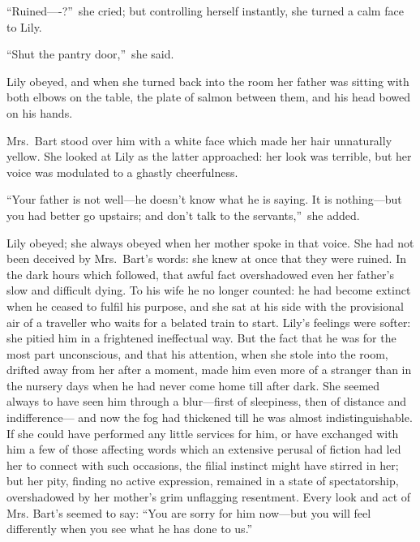 \documentclass[12pt,a4paper]{book}
\begin{document}
``Ruined----?''\ she cried; but controlling herself instantly, she
turned a calm face to Lily.





``Shut the pantry door,''\ she said.





Lily obeyed, and when she turned back into the room her father
was sitting with both elbows on the table, the plate of salmon
between them, and his head bowed on his hands.





Mrs.\ Bart stood over him with a white face which made her hair
unnaturally yellow. She looked at Lily as the latter approached: 
her look was terrible, but her voice was modulated to a ghastly
cheerfulness.





``Your father is not well---he doesn't know what he is saying. It
is nothing---but you had better go upstairs; and don't talk to the
servants,''\ she added.





Lily obeyed; she always obeyed when her mother spoke in that
voice. She had not been deceived by Mrs.\ Bart's words: she knew
at once that they were ruined. In the dark hours which followed,
that awful fact overshadowed even her father's slow and difficult
dying. To his wife he no longer counted: he had become extinct
when he ceased to fulfil his purpose, and she sat at his side
with the provisional air of a traveller who waits for a belated
train to start. Lily's feelings were softer: she pitied him in a
frightened ineffectual way. But the fact that he was for the most
part unconscious, and that his attention, when she stole into the
room, drifted away from her after a moment, made him even more of
a stranger than in the nursery days when he had never come home
till after dark. She seemed always to have seen him through a
blur---first of sleepiness, then of distance and indifference---
and now the fog had thickened till he was almost
indistinguishable. If she could have performed any little
services for him, or have exchanged with him a few of those
affecting words which an extensive perusal of fiction had
led her to connect with such occasions, the filial instinct might
have stirred in her; but her pity, finding no active expression,
remained in a state of spectatorship, overshadowed by her
mother's grim unflagging resentment. Every look and act of Mrs.
Bart's seemed to say: ``You are sorry for him now---but you will
feel differently when you see what he has done to us.''
\end{document}
